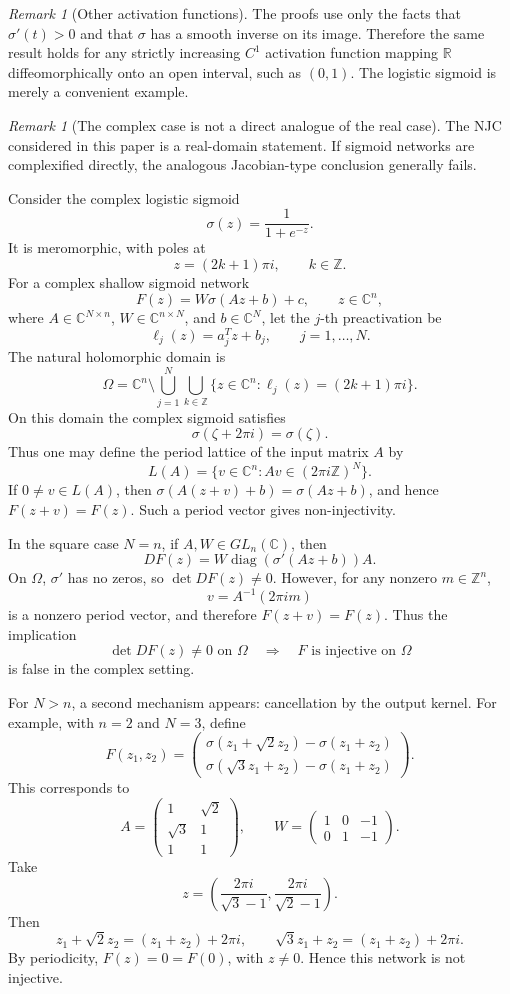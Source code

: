 \documentclass[a4paper,11pt]{article}
\theoremstyle{plain}
\theoremstyle{definition}
\theoremstyle{remark}
\newtheorem{remark}[theorem]{Remark}
\DeclareMathOperator{\diag}{diag}
\begin{document}
\begin{remark}[Other activation functions]
The proofs use only the facts that \(\sigma'(t)>0\) and that \(\sigma\) has a smooth inverse on its image. Therefore the same result holds for any strictly increasing \(C^1\) activation function mapping \(\mathbb R\) diffeomorphically onto an open interval, such as \((0,1)\). The logistic sigmoid is merely a convenient example.
\end{remark}

\begin{remark}[The complex case is not a direct analogue of the real case]
The NJC considered in this paper is a real-domain statement. If sigmoid networks are complexified directly, the analogous Jacobian-type conclusion generally fails.

Consider the complex logistic sigmoid
\[
\sigma(z)=\frac{1}{1+e^{-z}}.
\]
It is meromorphic, with poles at
\[
z=(2k+1)\pi i,
\qquad k\in\mathbb Z.
\]
For a complex shallow sigmoid network
\[
F(z)=W\sigma(Az+b)+c,
\qquad z\in\mathbb C^n,
\]
where \(A\in\mathbb C^{N\times n}\), \(W\in\mathbb C^{n\times N}\), and \(b\in\mathbb C^N\), let the \(j\)-th preactivation be
\[
\ell_j(z)=a_j^Tz+b_j,
\qquad j=1,\ldots,N.
\]
The natural holomorphic domain is
\[
\Omega=\mathbb C^n\setminus\bigcup_{j=1}^N\bigcup_{k\in\mathbb Z}\{z\in\mathbb C^n:\ell_j(z)=(2k+1)\pi i\}.
\]
On this domain the complex sigmoid satisfies
\[
\sigma(\zeta+2\pi i)=\sigma(\zeta).
\]
Thus one may define the period lattice of the input matrix \(A\) by
\[
L(A)=\{v\in\mathbb C^n:Av\in(2\pi i\mathbb Z)^N\}.
\]
If \(0\ne v\in L(A)\), then \(\sigma(A(z+v)+b)=\sigma(Az+b)\), and hence \(F(z+v)=F(z)\). Such a period vector gives non-injectivity.

In the square case \(N=n\), if \(A,W\in GL_n(\mathbb C)\), then
\[
DF(z)=W\diag(\sigma'(Az+b))A.
\]
On \(\Omega\), \(\sigma'\) has no zeros, so \(\det DF(z)\ne0\). However, for any nonzero \(m\in\mathbb Z^n\),
\[
v=A^{-1}(2\pi i m)
\]
is a nonzero period vector, and therefore \(F(z+v)=F(z)\). Thus the implication
\[
\det DF(z)\ne0\text{ on }\Omega
\quad\Longrightarrow\quad
F\text{ is injective on }\Omega
\]
is false in the complex setting.

For \(N>n\), a second mechanism appears: cancellation by the output kernel. For example, with \(n=2\) and \(N=3\), define
\[
F(z_1,z_2)=
\begin{pmatrix}
\sigma(z_1+\sqrt2 z_2)-\sigma(z_1+z_2)\\
\sigma(\sqrt3 z_1+z_2)-\sigma(z_1+z_2)
\end{pmatrix}.
\]
This corresponds to
\[
A=
\begin{pmatrix}
1&\sqrt2\\
\sqrt3&1\\
1&1
\end{pmatrix},
\qquad
W=
\begin{pmatrix}
1&0&-1\\
0&1&-1
\end{pmatrix}.
\]
Take
\[
z=\left(\frac{2\pi i}{\sqrt3-1},\frac{2\pi i}{\sqrt2-1}\right).
\]
Then
\[
z_1+\sqrt2z_2=(z_1+z_2)+2\pi i,
\qquad
\sqrt3z_1+z_2=(z_1+z_2)+2\pi i.
\]
By periodicity, \(F(z)=0=F(0)\), with \(z\ne0\). Hence this network is not injective.
\end{remark}
\end{document}
